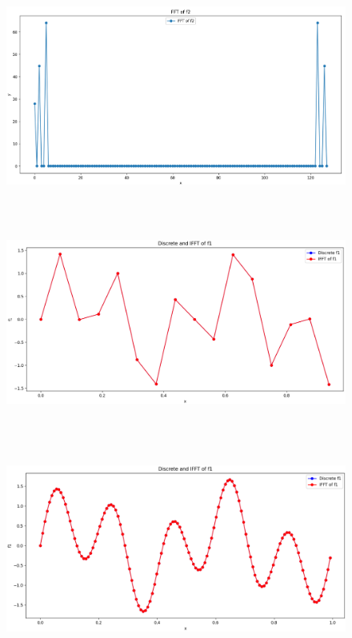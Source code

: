 \documentclass{ctexart}
\begin{document}
			\begin{figure}[H]
				\centering 
				\includegraphics[height=7cm,width=14cm]{2.png}
				\end{figure}
				\begin{figure}[H]
					\centering 
					\includegraphics[height=7cm,width=14cm]{3.png}
					\end{figure}
					\begin{figure}[H]
						\centering 
						\includegraphics[height=7cm,width=14cm]{4.png}
						\end{figure}
\end{document}
